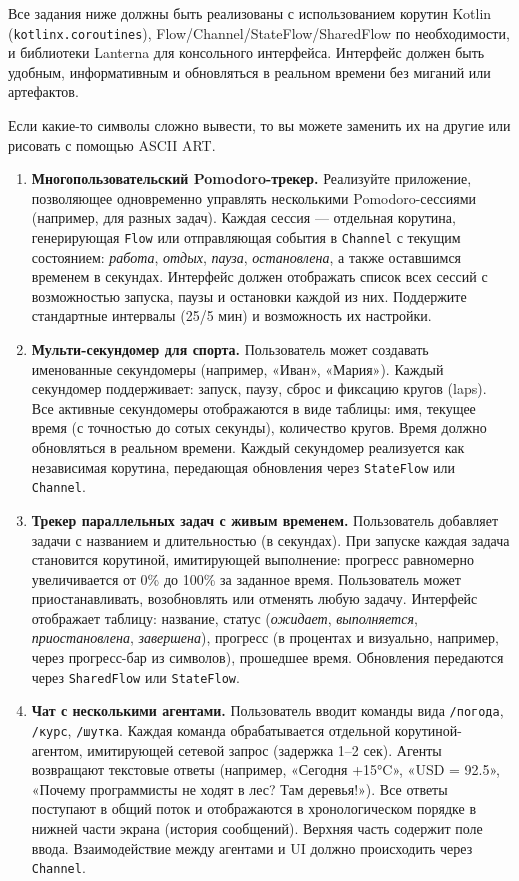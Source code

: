 Все задания ниже должны быть реализованы с использованием корутин Kotlin (\texttt{kotlinx.coroutines}), Flow/Channel/StateFlow/SharedFlow по необходимости, и библиотеки Lanterna для консольного интерфейса. Интерфейс должен быть удобным, информативным и обновляться в реальном времени без миганий или артефактов.

Если какие-то символы сложно вывести, то вы можете заменить их на другие или рисовать с помощью ASCII ART.

\begin{enumerate}
\item[1]
\textbf{Многопользовательский Pomodoro-трекер.} Реализуйте приложение, позволяющее одновременно управлять несколькими Pomodoro-сессиями (например, для разных задач). Каждая сессия — отдельная корутина, генерирующая \texttt{Flow} или отправляющая события в \texttt{Channel} с текущим состоянием: \textit{работа}, \textit{отдых}, \textit{пауза}, \textit{остановлена}, а также оставшимся временем в секундах. Интерфейс должен отображать список всех сессий с возможностью запуска, паузы и остановки каждой из них. Поддержите стандартные интервалы (25/5 мин) и возможность их настройки.

\item[2]
\textbf{Мульти-секундомер для спорта.} Пользователь может создавать именованные секундомеры (например, «Иван», «Мария»). Каждый секундомер поддерживает: запуск, паузу, сброс и фиксацию кругов (laps). Все активные секундомеры отображаются в виде таблицы: имя, текущее время (с точностью до сотых секунды), количество кругов. Время должно обновляться в реальном времени. Каждый секундомер реализуется как независимая корутина, передающая обновления через \texttt{StateFlow} или \texttt{Channel}.

\item[3]
\textbf{Трекер параллельных задач с живым временем.} Пользователь добавляет задачи с названием и длительностью (в секундах). При запуске каждая задача становится корутиной, имитирующей выполнение: прогресс равномерно увеличивается от 0\% до 100\% за заданное время. Пользователь может приостанавливать, возобновлять или отменять любую задачу. Интерфейс отображает таблицу: название, статус (\textit{ожидает}, \textit{выполняется}, \textit{приостановлена}, \textit{завершена}), прогресс (в процентах и визуально, например, через прогресс-бар из символов), прошедшее время. Обновления передаются через \texttt{SharedFlow} или \texttt{StateFlow}.

\item[4]
\textbf{Чат с несколькими агентами.} Пользователь вводит команды вида \texttt{/погода}, \texttt{/курс}, \texttt{/шутка}. Каждая команда обрабатывается отдельной корутиной-агентом, имитирующей сетевой запрос (задержка 1–2 сек). Агенты возвращают текстовые ответы (например, «Сегодня +15°C», «USD = 92.5», «Почему программисты не ходят в лес? Там деревья!»). Все ответы поступают в общий поток и отображаются в хронологическом порядке в нижней части экрана (история сообщений). Верхняя часть содержит поле ввода. Взаимодействие между агентами и UI должно происходить через \texttt{Channel}.


\end{enumerate}
